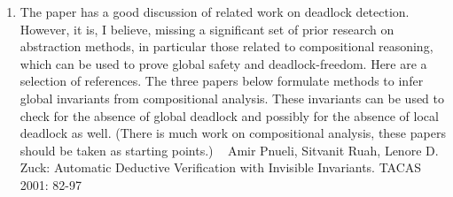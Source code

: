 \begin{enumerate}
\item The paper has a good discussion of related work on deadlock detection.
 However, it is, I believe, missing a significant set of prior research on 
 abstraction methods, in particular those related to compositional 
 reasoning, which can be used to prove global safety and deadlock-freedom. 
 Here are a selection of references. The three papers below formulate 
 methods to infer global invariants from compositional analysis. 
 These invariants can be used to check for the absence of global deadlock 
 and possibly for the absence of local deadlock as well. 
 (There is much work on compositional analysis, these papers should be 
 taken as starting points.)
~
Amir Pnueli, Sitvanit Ruah, Lenore D. Zuck:
Automatic Deductive Verification with Invisible Invariants. TACAS 2001: 82-97


~


\end{enumerate}
